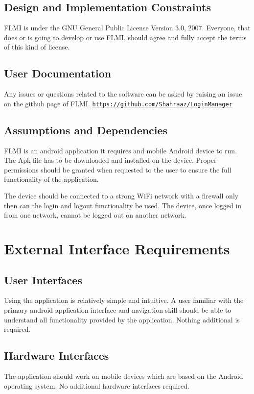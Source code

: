 \section{Design and Implementation Constraints}
FLMI is under the GNU General Public License Version 3.0, 2007. Everyone, that does or is going to develop or use FLMI, should agree and fully accept the terms of this kind of license. 

\section{User Documentation}
Any issues or questions related to the software can be asked by raising an issue on the github page of FLMI.
\href{https://github.com/Shahraaz/LoginManager}{\texttt{https://github.com/Shahraaz/LoginManager}}

\section{Assumptions and Dependencies}
FLMI is an android application it requires and mobile Android device to run. The Apk file has to be downloaded and installed on the device. Proper permissions should be granted when requested to the user to ensure the full functionality of the application. 

The device should be connected to a strong WiFi network with a firewall only then can the login and logout functionality be used. The device, once logged in from one network, cannot be logged out on another network.

\newpage
\chapter{External Interface Requirements}
\label{External Interface Requirements}

\section{User Interfaces}

Using the application is relatively simple and intuitive. A user familiar with the primary android application interface and navigation skill should be able to understand all functionality provided by the application. Nothing additional is required.

\section{Hardware Interfaces}
The application should work on mobile devices which are based on the Android operating system. No additional hardware interfaces required.

